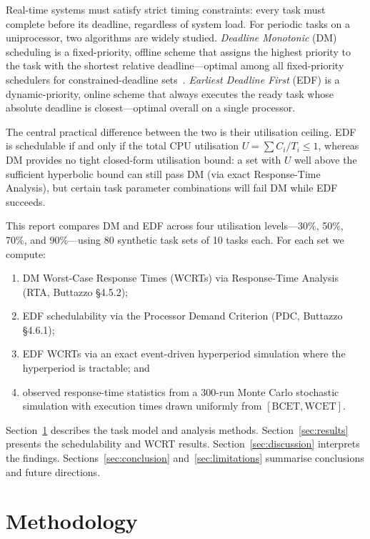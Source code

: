\documentclass[a4paper,11pt]{article}
\begin{document}
Real-time systems must satisfy strict timing constraints: every task must complete before its
deadline, regardless of system load. For periodic tasks on a uniprocessor, two algorithms are
widely studied. \emph{Deadline Monotonic} (DM) scheduling is a fixed-priority, offline scheme
that assigns the highest priority to the task with the shortest relative deadline---optimal
among all fixed-priority schedulers for constrained-deadline sets~\cite{buttazzo2024}.
\emph{Earliest Deadline First} (EDF) is a dynamic-priority, online scheme that always executes
the ready task whose absolute deadline is closest---optimal overall on a single processor.

The central practical difference between the two is their utilisation ceiling. EDF is
schedulable if and only if the total CPU utilisation $U = \sum C_i/T_i \leq 1$, whereas DM
provides no tight closed-form utilisation bound: a set with $U$ well above the sufficient
hyperbolic bound can still pass DM (via exact Response-Time Analysis), but certain task
parameter combinations will fail DM while EDF succeeds.

This report compares DM and EDF across four utilisation levels---30\%, 50\%, 70\%, and
90\%---using 80 synthetic task sets of 10 tasks each. For each set we compute:
\begin{enumerate}
    \item DM Worst-Case Response Times (WCRTs) via Response-Time Analysis (RTA, Buttazzo
          \S4.5.2);
    \item EDF schedulability via the Processor Demand Criterion (PDC, Buttazzo \S4.6.1);
    \item EDF WCRTs via an exact event-driven hyperperiod simulation where the hyperperiod is
          tractable; and
    \item observed response-time statistics from a 300-run Monte Carlo stochastic simulation
          with execution times drawn uniformly from $[\text{BCET}, \text{WCET}]$.
\end{enumerate}

Section~\ref{sec:methodology} describes the task model and analysis methods.
Section~\ref{sec:results} presents the schedulability and WCRT results.
Section~\ref{sec:discussion} interprets the findings.
Sections~\ref{sec:conclusion} and~\ref{sec:limitations} summarise conclusions and future
directions.

\section{Methodology}
\label{sec:methodology}
\end{document}
